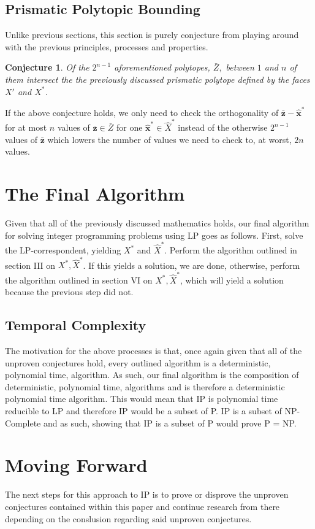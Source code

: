 \documentclass[conference]{IEEEtran}
\numberwithin{equation}{section}
\numberwithin{figure}{section}
\theoremstyle{plain}
\newtheorem{conj}[equation]{Conjecture}
\theoremstyle{definition}
\newcommand{\1}{\ensuremath \mathbbm{1}}
\begin{document}
\subsection{Prismatic Polytopic Bounding}
Unlike previous sections, this section is purely conjecture from playing around 
with the previous principles, processes and properties. \\
\begin{conj}
  Of the $2^{n-1}$ aforementioned polytopes, $\bar{Z},$ between $1$ and $n$ of 
  them intersect the the previously discussed prismatic polytope defined by the 
  faces $X'$ and $X^*$. \\
\end{conj}
If the above conjecture holds, we only need to check the orthogonality of 
$\mathbf{\bar{z}} - \mathbf{\hat{x}}^*$ for at most $n$ values of 
$\mathbf{\bar{z}} \in \bar{Z}$ for one $\mathbf{\hat{x}}^* \in \hat{X}^*$ instead 
of the otherwise $2^{n-1}$ values of $\mathbf{\bar{z}}$ which lowers the number 
of values we need to check to, at worst, $2n$ values.

\section{The Final Algorithm}
Given that all of the previously discussed mathematics holds, our final 
algorithm for solving integer programming problems using LP goes as follows. 
First, solve the LP-correspondent, yielding $X^*$ and $\hat{X}^*$. Perform the 
algorithm outlined in section III on $X^*,\hat{X}^*$. If this yields a solution, 
we are done, otherwise, perform the algorithm outlined in section VI on $X^*,
\hat{X}^*$, which will yield a solution because the previous step did not. \\

\subsection{Temporal Complexity}
The motivation for the above processes is that, once again given that all of the 
unproven conjectures hold, every outlined algorithm is a deterministic, 
polynomial time, algorithm. As such, our final algorithm is the composition of 
deterministic, polynomial time, algorithms and is therefore a deterministic 
polynomial time algorithm. This would mean that IP is polynomial time reducible 
to LP and therefore IP would be a subset of P. IP is a subset of NP-Complete and 
as such, showing that IP is a subset of P would prove P = NP. \\

\section{Moving Forward}
The next steps for this approach to IP is to prove or disprove the unproven 
conjectures contained within this paper and continue research from there 
depending on the conslusion regarding said unproven conjectures. \\
\end{document}
